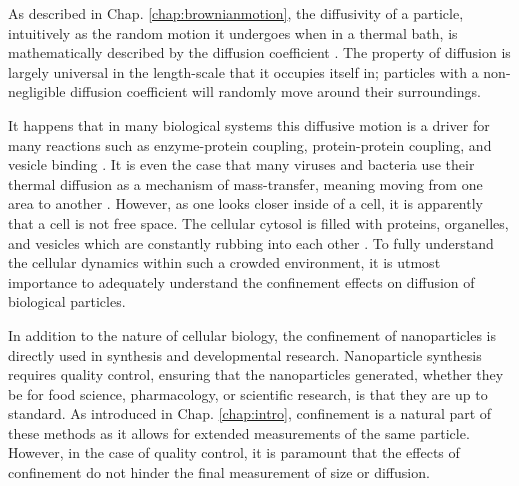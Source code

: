 As described in Chap. \ref{chap:brownianmotion}, the diffusivity of a particle, intuitively as the random motion it undergoes when in a thermal bath, is mathematically described by the diffusion coefficient \cite{einstein1956investigations,pathriaStatisticalMechanics2011}. The property of diffusion is largely universal in the length-scale that it occupies itself in; particles with a non-negligible diffusion coefficient will randomly move around their surroundings. 

It happens that in many biological systems this diffusive motion is a driver for many reactions such as enzyme-protein coupling, protein-protein coupling, and vesicle binding \cite{Phillips2013, Bialek2012Biophysics}. It is even the case that many viruses and bacteria use their thermal diffusion as a mechanism of mass-transfer, meaning moving from one area to another \cite{murray1992viral}. However, as one looks closer inside of a cell, it is apparently that a cell is not free space. The cellular cytosol is filled with proteins, organelles, and vesicles which are constantly rubbing into each other \cite{Phillips2013}. To fully understand the cellular dynamics within such a crowded environment, it is utmost importance to adequately understand the confinement effects on diffusion of biological particles. 

In addition to the nature of cellular biology, the confinement of nanoparticles is directly used in synthesis and developmental research. Nanoparticle synthesis requires quality control, ensuring that the nanoparticles generated, whether they be for food science, pharmacology, or scientific research, is that they are up to standard. As introduced in Chap. \ref{chap:intro}, confinement is a natural part of these methods as it allows for extended measurements of the same particle. However, in the case of quality control, it is paramount that the effects of confinement do not hinder the final measurement of size or diffusion. 


